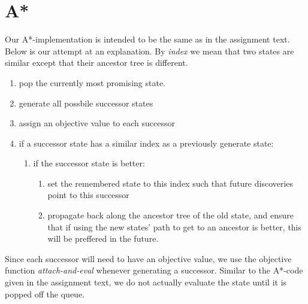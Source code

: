 \documentclass[journal]{IEEEtran}
\begin{document}
\section{A*}
Our A*-implementation is intended to be the same as in the assignment text.
Below is our attempt at an explanation. By \textit{index} we mean that two states
are similar except that their ancestor tree is different.
\begin{enumerate}
    \item pop the currently most promising state.
    \item generate all possbile successor states
    \item assign an objective value to each successor
    \item if a successor state has a similar index as a previously generate state:
        \begin{enumerate}
            \item if the successor state is better:
                \begin{enumerate}
                    \item set the remembered state to this index such that future
                        discoveries point to this successor
                    \item propagate back along the ancestor tree of the old state,
                        and ensure that if using the new states' path to get 
                        to an ancestor is better, this will be preffered in the 
                        future.
                \end{enumerate}
        \end{enumerate}
\end{enumerate}

%
Since each successor will need to have an objective value, we use the objective
function \textit{attach-and-eval} whenever generating a successor. Similar to 
the A*-code given in the assignment text, we do not actually evaluate the 
state until it is popped off the queue.
\end{document}
